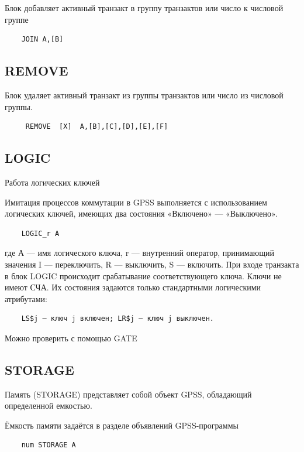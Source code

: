 \documentclass[14pt]{extarticle}
\begin{document}
Блок добавляет активный транзакт в группу транзактов или число к числовой группе 

\begin{lstlisting}
	JOIN A,[B]
\end{lstlisting}

\subsection*{REMOVE}

Блок удаляет активный транзакт из группы транзактов или число из числовой группы.

\begin{lstlisting}
	 REMOVE  [X]  A,[B],[C],[D],[E],[F]
\end{lstlisting}

\subsection*{LOGIC}

Работа логических ключей

Имитация процессов коммутации в GPSS выполняется с использованием логических ключей, имеющих два состояния «Включено» — «Выключено».

\begin{lstlisting}
	LOGIC_r A
\end{lstlisting}

где А — имя логического ключа, r — внутренний оператор, принимающий значения I — переключить, R — выключить, S — включить. При входе транзакта в блок LOGIC происходит срабатывание соответствующего ключа. Ключи не имеют СЧА. Их состояния задаются только стандартными логическими атрибутами:

\begin{lstlisting}
	LS$j — ключ j включен; LR$j — ключ j выключен.
\end{lstlisting}

Можно проверить с помощью GATE


\subsection*{STORAGE}

Память (STORAGE) представляет собой объект GPSS, обладающий определенной емкостью.

Ёмкость памяти задаётся в разделе объявлений GPSS-программы

\begin{lstlisting}
	num STORAGE A
\end{lstlisting}
\end{document}
